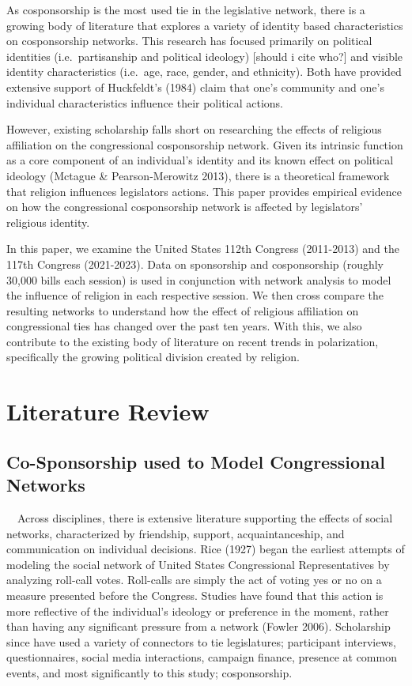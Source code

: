 \documentclass[Royal,times,sageh]{sagej}
\begin{document}
As cosponsorship is the most used tie in the legislative network, there is a growing body of literature that explores a variety of identity based characteristics on cosponsorship networks. This research has focused primarily on political identities (i.e.~partisanship and political ideology) {[}should i cite who?{]} and visible identity characteristics (i.e.~age, race, gender, and ethnicity). Both have provided extensive support of Huckfeldt's (1984) claim that one's community and one's individual characteristics influence their political actions.

However, existing scholarship falls short on researching the effects of religious affiliation on the congressional cosponsorship network. Given its intrinsic function as a core component of an individual's identity and its known effect on political ideology (Mctague \& Pearson-Merowitz 2013), there is a theoretical framework that religion influences legislators actions. This paper provides empirical evidence on how the congressional cosponsorship network is affected by legislators' religious identity.

In this paper, we examine the United States 112th Congress (2011-2013) and the 117th Congress (2021-2023). Data on sponsorship and cosponsorship (roughly 30,000 bills each session) is used in conjunction with network analysis to model the influence of religion in each respective session. We then cross compare the resulting networks to understand how the effect of religious affiliation on congressional ties has changed over the past ten years. With this, we also contribute to the existing body of literature on recent trends in polarization, specifically the growing political division created by religion.

\hypertarget{literature-review}{%
\section{Literature Review}\label{literature-review}}

\hypertarget{co-sponsorship-used-to-model-congressional-networks}{%
\subsection{Co-Sponsorship used to Model Congressional Networks}\label{co-sponsorship-used-to-model-congressional-networks}}

~~Across disciplines, there is extensive literature supporting the effects of social networks, characterized by friendship, support, acquaintanceship, and communication on individual decisions. Rice (1927) began the earliest attempts of modeling the social network of United States Congressional Representatives by analyzing roll-call votes. Roll-calls are simply the act of voting yes or no on a measure presented before the Congress. Studies have found that this action is more reflective of the individual's ideology or preference in the moment, rather than having any significant pressure from a network (Fowler 2006). Scholarship since have used a variety of connectors to tie legislatures; participant interviews, questionnaires, social media interactions, campaign finance, presence at common events, and most significantly to this study; cosponsorship.
\end{document}

